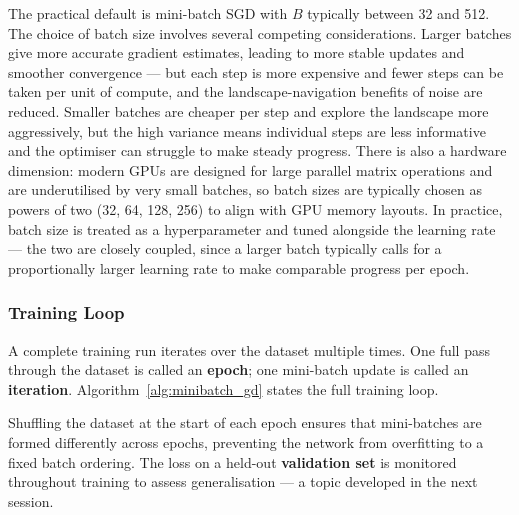The practical default is mini-batch SGD with $B$ typically between 32 and 512. The choice of batch size involves several competing considerations. Larger batches give more accurate gradient estimates, leading to more stable updates and smoother convergence — but each step is more expensive and fewer steps can be taken per unit of compute, and the landscape-navigation benefits of noise are reduced. Smaller batches are cheaper per step and explore the landscape more aggressively, but the high variance means individual steps are less informative and the optimiser can struggle to make steady progress. There is also a hardware dimension: modern GPUs are designed for large parallel matrix operations and are underutilised by very small batches, so batch sizes are typically chosen as powers of two (32, 64, 128, 256) to align with GPU memory layouts. In practice, batch size is treated as a hyperparameter and tuned alongside the learning rate — the two are closely coupled, since a larger batch typically calls for a proportionally larger learning rate to make comparable progress per epoch.

\subsubsection{Training Loop}

A complete training run iterates over the dataset multiple times. One full pass through the dataset is called an \textbf{epoch}; one mini-batch update is called an \textbf{iteration}. Algorithm~\ref{alg:minibatch_gd} states the full training loop.

\begin{algorithm}[H]
\DontPrintSemicolon
{}
\caption{Mini-Batch Gradient Descent}
\label{alg:minibatch_gd}
\end{algorithm}

Shuffling the dataset at the start of each epoch ensures that mini-batches are formed differently across epochs, preventing the network from overfitting to a fixed batch ordering. The loss on a held-out \textbf{validation set} is monitored throughout training to assess generalisation — a topic developed in the next session.

